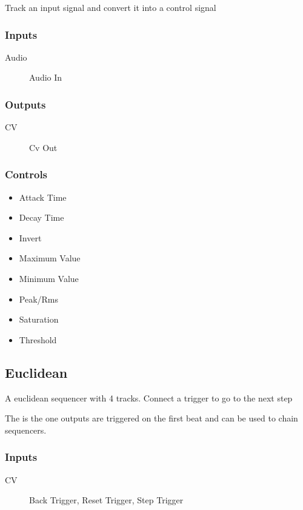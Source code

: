 Track an input signal and convert it into a control signal



\subsubsection{Inputs}
\begin{description}
\item [Audio] Audio In
\end{description}

\subsubsection{Outputs}
\begin{description}
\item [CV] Cv Out
\end{description}

\subsubsection{Controls}
\begin{itemize}
\item Attack Time
\item Decay Time
\item Invert
\item Maximum Value
\item Minimum Value
\item Peak/Rms
\item Saturation
\item Threshold
\end{itemize}

\subsection{Euclidean}

A euclidean sequencer with 4 tracks. Connect a trigger to go to the next step

The is the one outputs are triggered on the first beat and can be used to chain sequencers.

\subsubsection{Inputs}
\begin{description}
\item [CV] Back Trigger, Reset Trigger, Step Trigger
\end{description}

